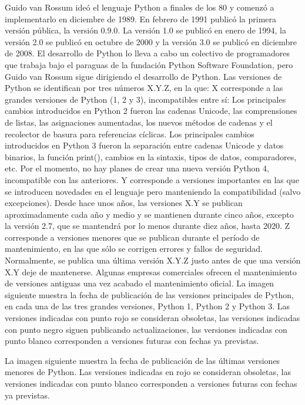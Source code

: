 \documentclass[12pt]{article}
\begin{document}
Guido van Rossum ideó el lenguaje Python a finales de los 80 y comenzó a implementarlo en diciembre de 1989. En febrero de 1991 publicó la primera versión pública, la versión 0.9.0. La versión 1.0 se publicó en enero de 1994, la versión 2.0 se publicó en octubre de 2000 y la versión 3.0 se publicó en diciembre de 2008. El desarrollo de Python lo lleva a cabo un colectivo de programadores que trabaja bajo el paraguas de la fundación Python Software Foundation, pero Guido van Rossum sigue dirigiendo el desarrollo de Python.
Las versiones de Python se identifican por tres números X.Y.Z, en la que:
X corresponde a las grandes versiones de Python (1, 2 y 3), incompatibles entre sí:
Los principales cambios introducidos en Python 2 fueron las cadenas Unicode, las comprensiones de listas, las asignaciones aumentadas, los nuevos métodos de cadenas y el recolector de basura para referencias cíclicas.
Los principales cambios introducidos en Python 3 fueron la separación entre cadenas Unicode y datos binarios, la función print(), cambios en la sintaxis, tipos de datos, comparadores, etc.
Por el momento, no hay planes de crear una nueva versión Python 4, incompatible con las anteriores.
Y corresponde a versiones importantes en las que se introducen novedades en el lenguaje pero manteniendo la compatibilidad (salvo excepciones).
Desde hace unos años, las versiones X.Y se publican aproximadamente cada año y medio y se mantienen durante cinco años, excepto la versión 2.7, que se mantendrá por lo menos durante diez años, hasta 2020.
Z corresponde a versiones menores que se publican durante el período de mantenimiento, en las que sólo se corrigen errores y fallos de seguridad.
Normalmente, se publica una última versión X.Y.Z justo antes de que una versión X.Y deje de mantenerse. Algunas empresas comerciales ofrecen el mantenimiento de versiones antiguas una vez acabado el mantenimiento oficial.
La imagen siguiente muestra la fecha de publicación de las versiones principales de Python, en cada una de las tres grandes versiones, Python 1, Python 2 y Python 3. Las versiones indicadas con punto rojo se consideran obsoletas, las versiones indicadas con punto negro siguen publicando actualizaciones, las versiones indicadas con punto blanco corresponden a versiones futuras con fechas ya previstas.

La imagen siguiente muestra la fecha de publicación de las últimas versiones menores de Python. Las versiones indicadas en rojo se consideran obsoletas, las versiones indicadas con punto blanco corresponden a versiones futuras con fechas ya previstas.
\end{document}
